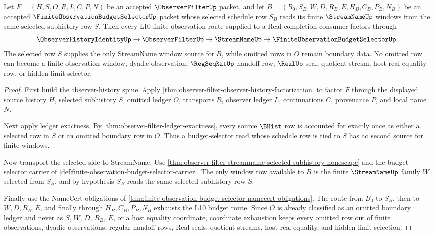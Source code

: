 \begin{theorem}
\label{thm:observer-filter-budget-selector-l10-handoff}
Let $F=(H,S,O,R,L,C,P,N)$ be an accepted $\ObserverFilterUp$ packet, and let $B=(B_0,S_B,W,D,R_B,E,H_B,C_B,P_B,N_B)$ be an accepted $\FiniteObservationBudgetSelectorUp$ packet whose selected schedule row $S_B$ reads its finite $\StreamNameUp$ windows from the same selected subhistory row $S$. Then every L10 finite-observation route supplied to a Real-completion consumer factors through
$$
\ObserverHistoryIdentityUp \to \ObserverFilterUp \to \StreamNameUp \to \FiniteObservationBudgetSelectorUp.
$$
The selected row $S$ supplies the only StreamName window source for $B$, while omitted rows in $O$ remain boundary data. No omitted row can become a finite observation window, dyadic observation, $\RegSeqRatUp$ handoff row, $\RealUp$ seal, quotient stream, host real equality row, or hidden limit selector.
\end{theorem}
\begin{proof}
First build the observer-history spine. Apply \autoref{thm:observer-filter-observer-history-factorization} to factor $F$ through the displayed source history $H$, selected subhistory $S$, omitted ledger $O$, transports $R$, observer ledger $L$, continuations $C$, provenance $P$, and local name $N$.

Next apply ledger exactness. By \autoref{thm:observer-filter-ledger-exactness}, every source $\BHist$ row is accounted for exactly once as either a selected row in $S$ or an omitted boundary row in $O$. Thus a budget-selector read whose schedule row is tied to $S$ has no second source for finite windows.

Now transport the selected side to StreamName. Use \autoref{thm:observer-filter-streamname-selected-subhistory-nonescape} and the budget-selector carrier of \autoref{def:finite-observation-budget-selector-carrier}. The only window row available to $B$ is the finite $\StreamNameUp$ family $W$ selected from $S_B$, and by hypothesis $S_B$ reads the same selected subhistory row $S$.

Finally use the NameCert obligations of \autoref{thm:finite-observation-budget-selector-namecert-obligations}. The route from $B_0$ to $S_B$, then to $W,D,R_B,E$, and finally through $H_B,C_B,P_B,N_B$ exhausts the L10 budget route. Since $O$ is already classified as an omitted boundary ledger and never as $S$, $W$, $D$, $R_B$, $E$, or a host equality coordinate, coordinate exhaustion keeps every omitted row out of finite observations, dyadic observations, regular handoff rows, Real seals, quotient streams, host real equality, and hidden limit selection.
\end{proof}

